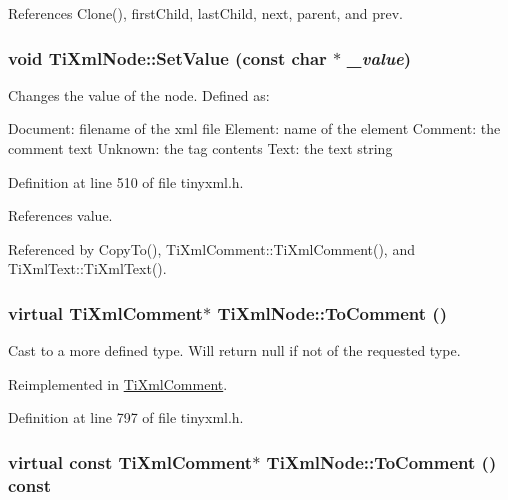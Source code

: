 References Clone(), firstChild, lastChild, next, parent, and prev.\hypertarget{class_ti_xml_node_a2a38329ca5d3f28f98ce932b8299ae90}{
\subsubsection[{SetValue}]{\setlength{\rightskip}{0pt plus 5cm}void TiXmlNode::SetValue (const char $\ast$ {\em \_\-value})}}
\label{class_ti_xml_node_a2a38329ca5d3f28f98ce932b8299ae90}
Changes the value of the node. Defined as: \begin{DoxyVerb}
      Document: filename of the xml file
      Element:  name of the element
      Comment:  the comment text
      Unknown:  the tag contents
      Text:             the text string
      \end{DoxyVerb}
 

Definition at line 510 of file tinyxml.h.

References value.

Referenced by CopyTo(), TiXmlComment::TiXmlComment(), and TiXmlText::TiXmlText().\hypertarget{class_ti_xml_node_a383e06a0787f7063953934867990f849}{
\subsubsection[{ToComment}]{\setlength{\rightskip}{0pt plus 5cm}virtual {\bf TiXmlComment}$\ast$ TiXmlNode::ToComment ()}}
\label{class_ti_xml_node_a383e06a0787f7063953934867990f849}


Cast to a more defined type. Will return null if not of the requested type. 

Reimplemented in \hyperlink{class_ti_xml_comment_acc7c7e07e13c23f17797d642981511df}{TiXmlComment}.

Definition at line 797 of file tinyxml.h.\hypertarget{class_ti_xml_node_aa0a5086f9eaee910bbfdc7f975e26574}{
\subsubsection[{ToComment}]{\setlength{\rightskip}{0pt plus 5cm}virtual const {\bf TiXmlComment}$\ast$ TiXmlNode::ToComment () const}}
\label{class_ti_xml_node_aa0a5086f9eaee910bbfdc7f975e26574}


